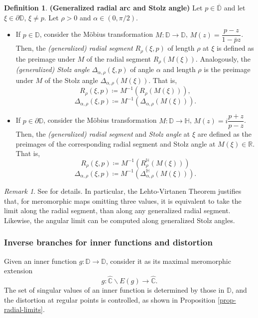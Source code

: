 \documentclass[11pt]{article}
\theoremstyle{definition}
\newtheorem{defi}[thm]{Definition}
\theoremstyle{remark}
\newtheorem{remark}[thm]{Remark}
\theoremstyle{plain}
\begin{document}
\begin{defi}{\bf (Generalized radial arc and  Stolz angle) } \label{defi-radi-stolz-angle} Let $ p\in\overline{\mathbb{D}} $ and let $ \xi\in\partial\mathbb{D} $, $ \xi\neq p $. Let $ \rho>0 $ and $ \alpha\in (0, \pi/2 )$. \begin{itemize}
		\item If $ p\in \mathbb{D}$, consider the Möbius transformation $ M\colon\mathbb{D}\to\mathbb{D} $, $ M(z)=\dfrac{p-z}{1-\overline{p}z} $. Then,  the {\em (generalized) radial segment} $ R_{\rho}(\xi,p) $ of length $ \rho $ at $ \xi $ is defined as the preimage under $ M $ of the radial segment $ R_\rho(M(\xi)) $. Analogously, the {\em (generalized) Stolz angle} $ \Delta_{\alpha, \rho}(\xi, p) $ of angle $ \alpha $ and length $ \rho $  is  the preimage under $ M $ of the Stolz angle $ \Delta_{\alpha, \rho}(M(\xi)) $.
		That is, \[ R_{\rho}(\xi, p)\coloneqq M^{-1}(R_{\rho}(M(\xi))),\]\[ \Delta_{\alpha, \rho}(\xi, p)\coloneqq M^{-1}(\Delta_{\alpha,\rho}(M(\xi))).\]
		
		\item 	If $ p\in\partial\mathbb{D} $, consider the Möbius transformation $ M\colon\mathbb{D}\to\mathbb{H} $, $ M(z)=i\dfrac{p+z}{p-z} $. Then, the {\em (generalized) radial segment} and {\em Stolz angle} at $ \xi $ are defined as the preimages of the corresponding radial segment and Stolz angle at $ M(\xi) \in\mathbb{R}$. That is, \[ R_{\rho}(\xi,p)\coloneqq M^{-1}(R_{\rho}^\mathbb{H}(M(\xi)))\] \[ \Delta_{\alpha, \rho}(\xi,p)\coloneqq M^{-1}(\Delta_{\alpha,\rho}^\mathbb{H}(M(\xi))).\]
	\end{itemize}
\end{defi}

\begin{remark} See \cite[Sect. 2.3]{Jove} for details. In particular, the Lehto-Virtanen Theorem \cite[Sect. 4.1]{Pommerenke} justifies that, for meromorphic maps omitting three values, it is equivalent to take the limit along the radial segment, than along any generalized radial segment. Likewise, the angular limit can be computed along generalized Stolz angles. 
\end{remark}
\subsubsection*{Inverse branches for inner functions and distortion}
Given an inner function $ g\colon\mathbb{D}\to\mathbb{D} $, consider it as its maximal meromorphic extension \[g\colon \widehat{\mathbb{C}}\smallsetminus E(g)\to \widehat{\mathbb{C}}.\]The set of singular values of an inner function is determined by those in $ \mathbb{D} $, and the distortion at regular points is controlled, as shown in Proposition \ref{prop-radial-limits}.
\end{document}
